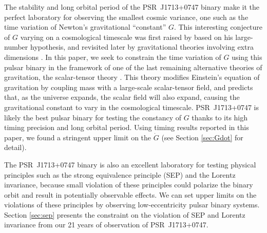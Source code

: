 The stability and long orbital period of the PSR~J1713+0747 binary make it the
perfect laboratory for observing the smallest cosmic variance, 
one such as the time variation of Newton's gravitational ``constant'' $G$. 
This interesting conjecture of $G$ varying on a cosmological timescale was first 
raised by \citet{dir37} based on his large-number hypothesis, and 
revisited later by gravitational theories involving extra dimensions
\citep{mar84,ww86a}.
In this paper, we seek to constrain the time variation of $G$ using this pulsar
binary in the framework of one of the last remaining alternative theories of gravitation, the scalar-tensor theory \citep{jor59,fie56,bd61}. 
This theory modifies Einstein's equation of gravitation by coupling mass with
a large-scale scalar-tensor field, and predicts that, as the universe expands,
the scalar field will also expand, causing the gravitational constant to vary  
in the cosmological timescale. 
PSR~J1713+0747 is likely the best pulsar binary for testing the constancy of
$G$ thanks to its high timing precision and long orbital period. Using timing
results reported in this paper, we found a stringent upper limit on the
$\dot{G}$ (see Section \ref{sec:Gdot} for detail). 

The PSR~J1713+0747 binary is also an excellent laboratory for testing physical 
principles such as the strong equivalence principle (SEP) and the Lorentz invariance, because small violation of these principles could polarize the
binary orbit and result in potentially observable effects. We can set
upper limits on the violations of these principles by observing
low-eccentricity pulsar binary systems. Section \ref{sec:sep} presents the
constraint on the violation of SEP and Lorentz invariance from our 21 years of observation of PSR~J1713+0747.

